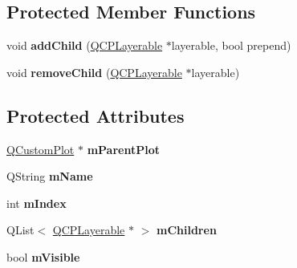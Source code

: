 \subsection*{Protected Member Functions}
\begin{DoxyCompactItemize}
\item 
void {\bfseries add\+Child} (\hyperlink{class_q_c_p_layerable}{Q\+C\+P\+Layerable} $\ast$layerable, bool prepend)\hypertarget{class_q_c_p_layer_a57ce5e49364aa9122276d5df3b4a0ddc}{}\label{class_q_c_p_layer_a57ce5e49364aa9122276d5df3b4a0ddc}

\item 
void {\bfseries remove\+Child} (\hyperlink{class_q_c_p_layerable}{Q\+C\+P\+Layerable} $\ast$layerable)\hypertarget{class_q_c_p_layer_ac2f64ac7761650582d968d86670ef362}{}\label{class_q_c_p_layer_ac2f64ac7761650582d968d86670ef362}

\end{DoxyCompactItemize}
\subsection*{Protected Attributes}
\begin{DoxyCompactItemize}
\item 
\hyperlink{class_q_custom_plot}{Q\+Custom\+Plot} $\ast$ {\bfseries m\+Parent\+Plot}\hypertarget{class_q_c_p_layer_a2f3374a7884bf403720cd1cf6f7ad1bb}{}\label{class_q_c_p_layer_a2f3374a7884bf403720cd1cf6f7ad1bb}

\item 
Q\+String {\bfseries m\+Name}\hypertarget{class_q_c_p_layer_a91e6298183cb4b9dfd4efdfaf1ecc220}{}\label{class_q_c_p_layer_a91e6298183cb4b9dfd4efdfaf1ecc220}

\item 
int {\bfseries m\+Index}\hypertarget{class_q_c_p_layer_a122088bcab6cec76a52b75ce8606605b}{}\label{class_q_c_p_layer_a122088bcab6cec76a52b75ce8606605b}

\item 
Q\+List$<$ \hyperlink{class_q_c_p_layerable}{Q\+C\+P\+Layerable} $\ast$ $>$ {\bfseries m\+Children}\hypertarget{class_q_c_p_layer_a704aa71bba469383c3a3c598c1ec0d28}{}\label{class_q_c_p_layer_a704aa71bba469383c3a3c598c1ec0d28}

\item 
bool {\bfseries m\+Visible}\hypertarget{class_q_c_p_layer_a264950deb08e589460c126c895a1e2b5}{}\label{class_q_c_p_layer_a264950deb08e589460c126c895a1e2b5}

\end{DoxyCompactItemize}
